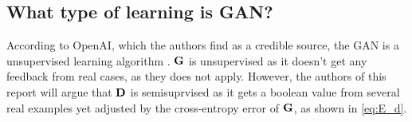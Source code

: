 \documentclass[../main.tex]{subfiles}
\begin{document}
\subsection{What type of learning is GAN?}

According to OpenAI, which the authors find as a credible source, the GAN is a unsupervised learning algorithm \cite{openAIBlog}. $\mathbf{G}$ is unsupervised as it doesn't get any feedback from real cases, as they does not apply. However, the authors of this report will argue that $\mathbf{D}$ is semisuprvised as it gets a boolean value from several real examples yet adjusted by the cross-entropy error of $\mathbf{G}$, as shown in \autoref{eq:E_d}. 
\end{document}
